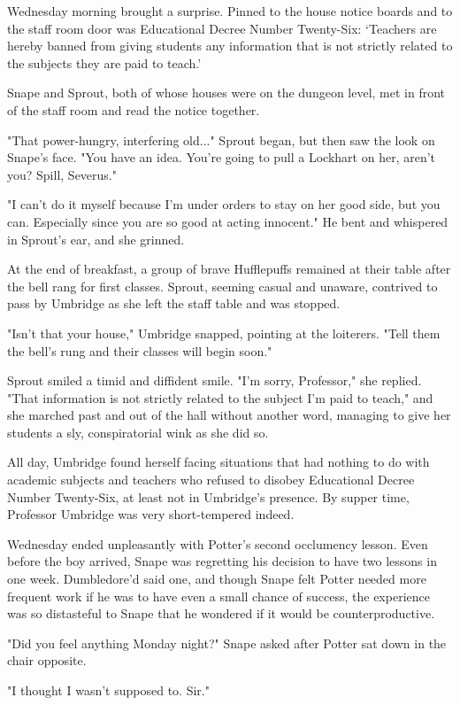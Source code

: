 \documentclass[a4paper,11pt]{article}
\begin{document}
Wednesday morning brought a surprise. Pinned to the house notice boards and to the staff room door was Educational Decree Number Twenty-Six: `Teachers are hereby banned from giving students any information that is not strictly related to the subjects they are paid to teach.'

Snape and Sprout, both of whose houses were on the dungeon level, met in front of the staff room and read the notice together.

"That power-hungry, interfering old..." Sprout began, but then saw the look on Snape's face. "You have an idea. You're going to pull a Lockhart on her, aren't you? Spill, Severus."

"I can't do it myself because I'm under orders to stay on her good side, but you can. Especially since you are so good at acting innocent." He bent and whispered in Sprout's ear, and she grinned.

At the end of breakfast, a group of brave Hufflepuffs remained at their table after the bell rang for first classes. Sprout, seeming casual and unaware, contrived to pass by Umbridge as she left the staff table and was stopped.

"Isn't that your house," Umbridge snapped, pointing at the loiterers. "Tell them the bell's rung and their classes will begin soon."

Sprout smiled a timid and diffident smile. "I'm sorry, Professor," she replied. "That information is not strictly related to the subject I'm paid to teach," and she marched past and out of the hall without another word, managing to give her students a sly, conspiratorial wink as she did so.

All day, Umbridge found herself facing situations that had nothing to do with academic subjects and teachers who refused to disobey Educational Decree Number Twenty-Six, at least not in Umbridge's presence. By supper time, Professor Umbridge was very short-tempered indeed.

Wednesday ended unpleasantly with Potter's second occlumency lesson. Even before the boy arrived, Snape was regretting his decision to have two lessons in one week. Dumbledore'd said one, and though Snape felt Potter needed more frequent work if he was to have even a small chance of success, the experience was so distasteful to Snape that he wondered if it would be counterproductive.

"Did you feel anything Monday night?" Snape asked after Potter sat down in the chair opposite.

"I thought I wasn't supposed to. Sir."
\end{document}
